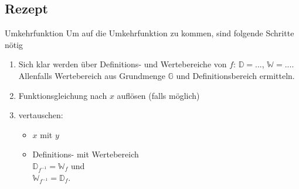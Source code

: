 \subsection{Rezept}
\begin{rezept}{Umkehrfunktion}{}
  Um auf die Umkehrfunktion zu kommen, sind folgende Schritte nötig
  \begin{enumerate}
  \item Sich klar werden über Definitions- und Wertebereiche von $f$:
    $\mathbb{D} =  ...$, $\mathbb{W} = ...$. Allenfalls Wertebereich aus Grundmenge $\mathbb{G}$ und Definitionsbereich ermitteln.
  \item Funktionsgleichung nach $x$ auf\/lösen (falls möglich)
  \item vertauschen:
    \begin{itemize}
  \item $x$ mit $y$ 
  \item Definitions- mit Wertebereich\\

      $\mathbb{D}_{f^{-1}} = \mathbb{W}_f$ und  \\

      $\mathbb{W}_{f^{-1}} = \mathbb{D}_f$.
      \end{itemize}
    \end{enumerate} 
  \end{rezept}
\newpage%
